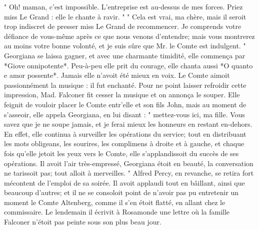 " Oh! maman, c'est impossible. L'entreprise est au-dessus de mes forces. Priez miss Le Grand : elle le chante à ravir. "
" Cela est vrai, ma chère, mais il seroit trop indiscret de presser miss Le Grand de recommencer. Je comprends votre défiance de vous-même après ce que nous venons d'entendre; mais vous montrerez au moins votre bonne volonté, et je suis sûre que Mr. le Comte est indulgent. "
Georgiana se laissa gagner, et avec une charmante timidité, elle commença par *Giove onnipotente*. Peu-à-peu elle prit du courage, elle chanta aussi *O quanto e amor possente*. Jamais elle n'avoit été mieux en voix. Le Comte aimoit passionnément la musique : il fut enchanté. Pour ne point laisser refroidir cette impression, Mad. Falconer fit cesser la musique et on annonça le souper. Elle feignit de vouloir placer le Comte entr'elle et son fils John, mais au moment de s'asseoir, elle appela Georgiana, en lui disant : " mettez-vous\setcounter{page}{119} ici, ma fille. Vous savez que je ne soupe jamais, et je ferai mieux les honneurs en restant en-dehors. En effet, elle continua à surveiller les opérations du service; tout en distribuant les mots obligeans, les sourires, les complimens à droite et à gauche, et chaque fois qu'elle jetoit les yeux vers le Comte, elle s'applandissoit du succès de ses opérations. Il avoit l'air très-empressé, Georgiana étoit en beauté, la conversation ne tarissoit pas; tout alloit à merveilles. "
Alfred Percy, en revanche, se retira fort mécontent de l'emploi de sa soirée. Il avoit applaudi tout en bâillant, ainsi que beaucoup d'autres; et il ne se consoloit point de n'avoir pas pu entretenir un moment le Comte Altenberg, comme il s'en étoit flatté, en allant chez le commissaire. Le lendemain il écrivit à Rosamonde une lettre où la famille Falconer n'étoit pas peinte sous son plus beau jour.
